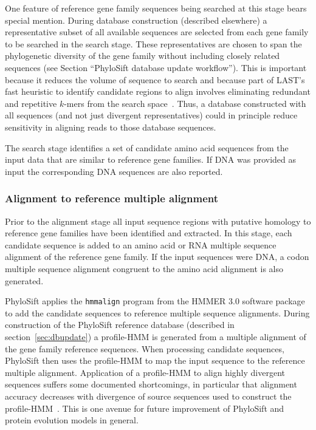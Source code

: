 \documentclass[10pt]{article}
\begin{document}
One feature of reference gene family sequences being searched at this stage bears special mention.
During database construction (described elsewhere) a representative subset of all available sequences are selected from each gene family to be searched in the search stage.
These representatives are chosen to span the phylogenetic diversity of the gene family without including closely related sequences (see Section ``PhyloSift database update workflow'').
This is important because it reduces the volume of sequence to search and because part of LAST's fast heuristic to identify candidate regions to align involves eliminating redundant and repetitive $k$-mers from the search space~\cite{Kiełbasa2011}.
Thus, a database constructed with all sequences (and not just divergent representatives) could in principle reduce sensitivity in aligning reads to those database sequences.

The search stage identifies a set of candidate amino acid sequences from the input data that are similar to reference gene families. If {DNA} was provided as input the corresponding {DNA} sequences are also reported.

\subsubsection*{Alignment to reference multiple alignment}
Prior to the alignment stage all input sequence regions with putative homology to reference gene families have been identified and extracted.
In this stage, each candidate sequence is added to an amino acid or {RNA} multiple sequence alignment of the reference gene family.
If the input sequences were {DNA}, a codon multiple sequence alignment congruent to the amino acid alignment is also generated.

PhyloSift applies the \texttt{hmmalign} program from the HMMER 3.0 software package~\cite{Eddy2011} to add the candidate sequences to reference multiple sequence alignments.
During construction of the PhyloSift reference database (described in section~\ref{sec:dbupdate}) a profile-HMM is generated from a multiple alignment of the gene family reference sequences.
When processing candidate sequences, PhyloSift then uses the profile-HMM to map the input sequence to the reference multiple alignment.
Application of a profile-HMM to align highly divergent sequences suffers some documented shortcomings, in particular that alignment accuracy decreases with divergence of source sequences used to construct the profile-HMM~\cite{Loytynoja2012}. 
This is one avenue for future improvement of PhyloSift and protein evolution models in general.
\end{document}
